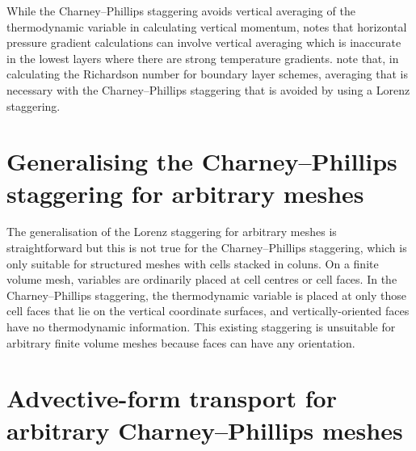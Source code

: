 While the Charney--Phillips staggering avoids vertical averaging of the thermodynamic variable in calculating vertical momentum, \citet{davies2005} notes that horizontal pressure gradient calculations can involve vertical averaging which is inaccurate in the lowest layers where there are strong temperature gradients.
\citet{holdaway2013a} note that, in calculating the Richardson number for boundary layer schemes, averaging that is necessary with the Charney--Phillips staggering that is avoided by using a Lorenz staggering.



\section{Generalising the Charney–Phillips staggering for arbitrary meshes}
The generalisation of the Lorenz staggering for arbitrary meshes is straightforward \citep{weller-shahrokhi2014} but this is not true for the Charney--Phillips staggering, which is only suitable for structured meshes with cells stacked in coluns.
On a finite volume mesh, variables are ordinarily placed at cell centres or cell faces.
In the Charney--Phillips staggering, the thermodynamic variable is placed at only those cell faces that lie on the vertical coordinate surfaces, and vertically-oriented faces have no thermodynamic information.
This existing staggering is unsuitable for arbitrary finite volume meshes because faces can have any orientation.



\section{Advective-form transport for arbitrary Charney--Phillips meshes}




